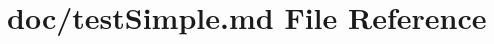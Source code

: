 \hypertarget{test_simple_8md}{}\section{doc/test\+Simple.md File Reference}
\label{test_simple_8md}
